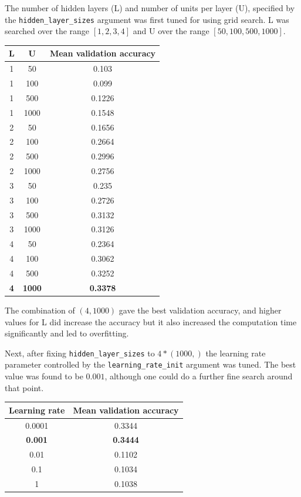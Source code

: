 \documentclass[12pt]{article}
\begin{document}
The number of hidden layers (L) and number of units per layer (U), specified by the \texttt{hidden\_layer\_sizes} argument was first tuned for using grid search. L was searched over the range $[1,2,3,4]$ and U over the range $[50,100,500,1000]$. 

\begin{center}
 \begin{tabular}{|c|c|c|}
  \hline
  L & U & Mean validation accuracy \\
  \hline
  1 & 50 & 0.103\\
  1 & 100 & 0.099\\
  1 & 500 & 0.1226\\
  1 & 1000 & 0.1548\\
  2 & 50 & 0.1656\\
  2 & 100 & 0.2664\\
  2 & 500 & 0.2996\\
  2 & 1000 & 0.2756\\ 
  3 & 50 & 0.235\\
  3 & 100 & 0.2726\\
  3 & 500 & 0.3132\\
  3 & 1000 & 0.3126\\ 
  4 & 50 & 0.2364\\
  4 & 100 & 0.3062\\
  4 & 500 & 0.3252\\
  \textbf{4} & \textbf{1000} & \textbf{0.3378}\\ 
  \hline
 \end{tabular}

\end{center}

The combination of $(4,1000)$ gave the best validation accuracy, and higher values for L did increase the accuracy but it also increased the computation time significantly and led to overfitting.

Next, after fixing \texttt{hidden\_layer\_sizes} to $4 * (1000,)$ the learning rate parameter controlled by the \texttt{learning\_rate\_init} argument was tuned. The best value was found to be $0.001$, although one could do a further fine search around that point.

\begin{center}
\begin{tabular}{|c|c|}
 \hline
 Learning rate & Mean validation accuracy \\
 \hline
 0.0001 & 0.3344\\
 \textbf{0.001} & \textbf{0.3444}\\
 0.01 & 0.1102\\
 0.1 & 0.1034\\
 1 & 0.1038\\
 \hline
\end{tabular}
\end{center}
\end{document}
